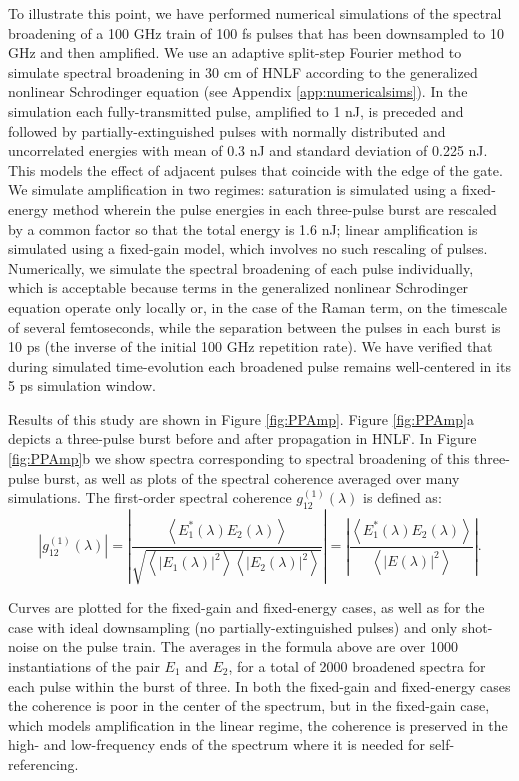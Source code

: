 To illustrate this point, we have performed numerical simulations of the spectral broadening of a 100 GHz train of 100 fs pulses that has been downsampled to 10 GHz and then amplified. We use an adaptive \cite{Heidt2009} split-step Fourier method \cite{Hult2007} to simulate spectral broadening in 30 cm of HNLF according to the generalized nonlinear Schrodinger equation \cite{Agrawal2007} (see Appendix \ref{app:numericalsims}). In the simulation each fully-transmitted pulse, amplified to 1 nJ, is preceded and followed by partially-extinguished pulses with normally distributed and uncorrelated energies with mean of 0.3 nJ and standard deviation of 0.225 nJ. This models the effect of adjacent pulses that coincide with the edge of the gate. We simulate amplification in two regimes: saturation is simulated using a fixed-energy method wherein the pulse energies in each three-pulse burst are rescaled by a common factor so that the total energy is 1.6 nJ; linear amplification is simulated using a fixed-gain model, which involves no such rescaling of pulses. Numerically, we simulate the spectral broadening of each pulse individually, which is acceptable because terms in the generalized nonlinear Schrodinger equation operate only locally or, in the case of the Raman term, on the timescale of several femtoseconds, while the separation between the pulses in each burst is 10 ps (the inverse of the initial 100 GHz repetition rate).  We have verified that during simulated time-evolution each broadened pulse remains well-centered in its 5 ps simulation window. 

Results of this study are shown in Figure \ref{fig:PPAmp}. Figure \ref{fig:PPAmp}a depicts a three-pulse burst before and after propagation in HNLF. In Figure \ref{fig:PPAmp}b we show spectra corresponding to spectral broadening of this three-pulse burst, as well as plots of the spectral coherence averaged over many simulations. The first-order spectral coherence $g_{12}^{(1)} (\lambda)$ is defined as:
\begin{equation}
\left|g_{12}^{(1)} (\lambda)\right|=\left|\frac{\left<E_1^*(\lambda)E_2(\lambda)\right>}{\sqrt{\left<|E_1(\lambda)|^2\right>\left<|E_2(\lambda)|^2\right>}}\right|=\left|\frac{\left<E_1^*(\lambda)E_2(\lambda)\right>}{\left<|E(\lambda)|^2\right>}\right|.
\end{equation}

Curves are plotted for the fixed-gain and fixed-energy cases, as well as for the case with ideal downsampling (no partially-extinguished pulses) and only shot-noise on the pulse train. The averages in the formula above are over 1000 instantiations of the pair $E_1$ and $E_2$, for a total of 2000 broadened spectra for each pulse within the burst of three. In both the fixed-gain and fixed-energy cases the coherence is poor in the center of the spectrum, but in the fixed-gain case, which models amplification in the linear regime, the coherence is preserved in the high- and low-frequency ends of the spectrum where it is needed for self-referencing.

